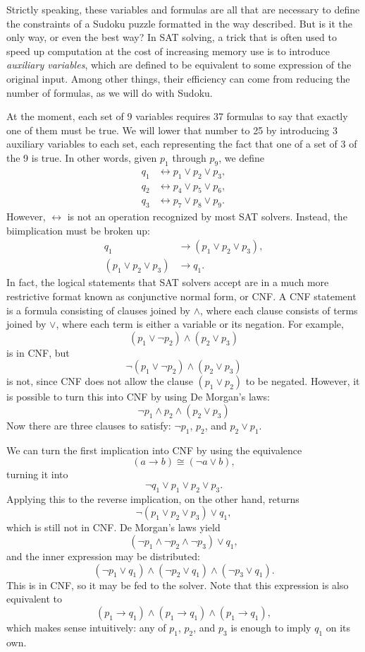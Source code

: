 \documentclass{article}
\begin{document}
Strictly speaking, these variables and formulas are all that are necessary
to define the constraints of a Sudoku puzzle
formatted in the way described.
But is it the only way, or even the best way?
In SAT solving, a trick that is often used to speed up computation
at the cost of increasing memory use
is to introduce \textit{auxiliary variables},
which are defined to be equivalent to some expression of the original input.
Among other things,
their efficiency can come from reducing the number of formulas,
as we will do with Sudoku.

At the moment, each set of 9 variables requires 37 formulas
to say that exactly one of them must be true.
We will lower that number to 25
by introducing 3 auxiliary variables to each set,
each representing the fact that
one of a set of 3 of the 9 is true.
In other words, given $p_1$ through $p_9$,
we define
\begin{align*}
  q_1 &\leftrightarrow p_1 \lor p_2 \lor p_3, \\
  q_2 &\leftrightarrow p_4 \lor p_5 \lor p_6, \\
  q_3 &\leftrightarrow p_7 \lor p_8 \lor p_9.
\end{align*}
However, $\leftrightarrow$ is not an operation recognized by most SAT solvers.
Instead, the biimplication must be broken up:
\begin{align*}
  q_1 &\rightarrow (p_1 \lor p_2 \lor p_3), \\
  (p_1 \lor p_2 \lor p_3) &\rightarrow q_1.
\end{align*}
In fact, the logical statements that SAT solvers accept
are in a much more restrictive format known as
conjunctive normal form, or CNF.
A CNF statement is a formula consisting of clauses joined by $\land$,
where each clause consists of terms joined by $\lor$,
where each term is either a variable or its negation.
For example,
\[(p_1 \lor \lnot p_2) \land (p_2 \lor p_3)\]
is in CNF, but
\[\lnot (p_1 \lor \lnot p_2) \land (p_2 \lor p_3)\]
is not, since CNF does not allow the clause
$(p_1 \lor p_2)$ to be negated.
However, it is possible to turn this into CNF by using De Morgan's laws:
\[\lnot p_1 \land p_2 \land (p_2 \lor p_3)\]
Now there are three clauses to satisfy:
$\lnot p_1$, $p_2$, and $p_2 \lor p_1$.

We can turn the first implication into CNF
by using the equivalence
\[(a \rightarrow b) \cong (\lnot a \lor b),\]
turning it into
\[\lnot q_1 \lor p_1 \lor p_2 \lor p_3.\]
Applying this to the reverse implication, on the other hand, returns
\[\lnot (p_1 \lor p_2 \lor p_3) \lor q_1,\]
which is still not in CNF.
De Morgan's laws yield
\[(\lnot p_1 \land \lnot p_2 \land \lnot p_3) \lor q_1,\]
and the inner expression may be distributed:
\[(\lnot p_1 \lor q_1) \land (\lnot p_2 \lor q_1) \land (\lnot p_3 \lor q_1).\]
This is in CNF, so it may be fed to the solver.
Note that this expression is also equivalent to
\[(p_1 \rightarrow q_1) \land (p_1 \rightarrow q_1) \land (p_1 \rightarrow q_1),\]
which makes sense intuitively:
any of $p_1$, $p_2$, and $p_3$ is enough to imply $q_1$ on its own.
\end{document}
